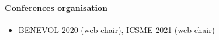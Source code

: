 \paragraph{Conferences organisation}

\begin{itemize}[label={}]
    \item BENEVOL 2020 (web chair), ICSME 2021 (web chair)
\end{itemize}



	
	
	
